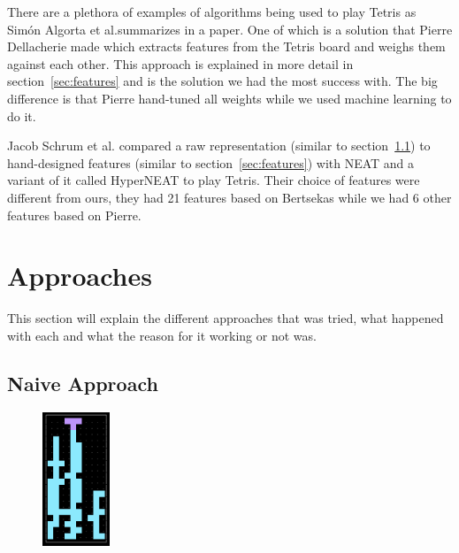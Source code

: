 \documentclass{article}
\begin{document}
There are a plethora of examples of algorithms being used to play Tetris as Sim{\'o}n Algorta et al.\@ summarizes in a paper\cite{TetrisML}.
One of which is a solution that Pierre Dellacherie\cite{pierre} made which extracts features from the Tetris board and weighs them against each other. 
This approach is explained in more detail in section~\ref{sec:features} and is the solution we had the most success with. The big difference is that Pierre hand-tuned all weights while we used machine learning to do it.

Jacob Schrum et al.\@\cite{comparingNEAT} compared a raw representation (similar to section~\ref{sec:naive}) to hand-designed features (similar to section~\ref{sec:features}) with NEAT and a variant of it called HyperNEAT to play Tetris.
Their choice of features were different from ours, they had 21 features based on Bertsekas\cite{bertsekas} while we had 6 other features based on Pierre\cite{pierre}.





\section{Approaches}\label{sec:approaches}

This section will explain the different approaches that was tried, what happened with each and what the reason for it working or not was.

\subsection{Naive Approach}\label{sec:naive}

\begin{figure}
  \begin{center}
    \includegraphics[width=0.18\textwidth]{naive.png}
  \end{center}
  \caption{}
  \label{fig:naive}
\end{figure}
\end{document}
